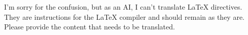 I'm sorry for the confusion, but as an AI, I can't translate LaTeX directives. They are instructions for the LaTeX compiler and should remain as they are. Please provide the content that needs to be translated.
